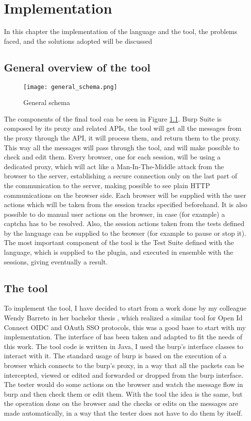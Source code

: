 \chapter{Implementation}
\label{chap:Implementation}
In this chapter the implementation of the language and the tool, the problems faced, and the solutions adopted will be discussed

\section{General overview of the tool}
\begin{figure}
    \texttt{[image: general\_schema.png]}
    \caption{General schema}
    \label{fig:general_schema}
\end{figure}

The components of the final tool can be seen in Figure \ref{fig:general_schema}. Burp Suite is composed by its proxy and related APIs, the tool will get all the messages from the proxy through the API, it will process them, and return them to the proxy. This way all the messages will pass through the tool, and will make possible to check and edit them.
Every browser, one for each session, will be using a dedicated proxy, which will act like a Man-In-The-Middle attack from the browser to the server, establishing a secure connection only on the last part of the communication to the server, making possible to see plain HTTP communications on the browser side. Each browser will be supplied with the user actions which will be taken from the session tracks specified beforehand. It is also possible to do manual user actions on the browser, in case (for example) a captcha has to be resolved. Also, the session actions taken from the tests defined by the language can be supplied to the browser (for example to pause or stop it). The most important component of the tool is the Test Suite defined with the language, which is supplied to the plugin, and executed in ensemble with the sessions, giving eventually a result.

\section{The tool}
To implement the tool, I have decided to start from a work done by my colleague Wendy Barreto in her bachelor thesis \cite{wendy_barreto}, which realized a similar tool for Open Id Connect \Gls{OIDC} and \Gls{OAuth} SSO protocols, this was a good base to start with my implementation. The interface of \cite{wendy_barreto} has been taken and adapted to fit the needs of this work. The tool code is written in Java, I used the \Gls{burp}'s interface classes to interact with it.
The standard usage of \Gls{burp} is based on the execution of a browser which connects to the \Gls{burp}'s proxy, in a way that all the packets can be intercepted, viewed or edited and forwarded or dropped from the \Gls{burp} interface. The tester would do some actions on the browser and watch the message flow in \Gls{burp} and then check them or edit them. With the tool the idea is the same, but the operation done on the browser and the checks or edits on the messages are made automatically, in a way that the tester does not have to do them by itself.

